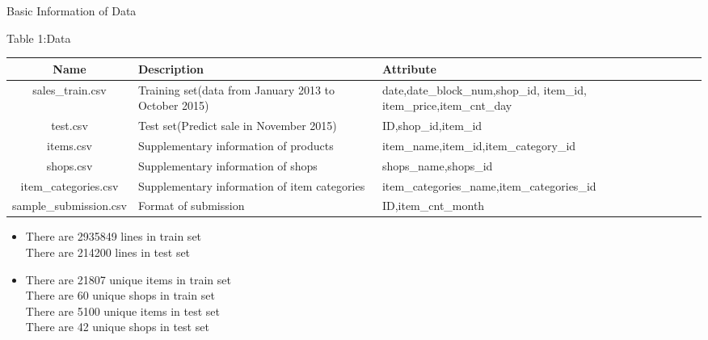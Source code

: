 \documentclass[
size=12pt,
paper=smartboard,  %
mode=present, 		%
display=slides, 	%
style=tuliplab,  	%
pauseslide,
fleqn,leqno]{powerdot}
\begin{document}
	
	\begin{slide}[toc=Basic Information of Data]{Basic Information of Data}
		\smallskip
		\centerline{\normalsize{Table 1:Data}}
		\begin{tabular}{cp{7cm}p{7cm}}
			\hline
			Name&Description&Attribute\\
			\hline
			sales_train.csv& Training set(data from January 2013 to October 2015)&date,date_block_num,shop_id, item_id, item_price,item_cnt_day\\
			test.csv& Test set(Predict sale in November 2015) & ID,shop_id,item_id\\
			items.csv& Supplementary information of products &item_name,item_id,item_category_id\\
			shops.csv& Supplementary information of shops & shops_name,shops_id\\
			item_categories.csv& Supplementary information of item categories & item_categories_name,item_categories_id\\
			sample_submission.csv& Format of submission & ID,item_cnt_month\\
			\hline
		\end{tabular}
		\begin{itemize}
			\bigskip
			\item 
			There are 2935849 lines in train set\\
			There are 214200 lines in test set\\
			\vbox{}
			\item 
			There are 21807 unique items in train set\\
			There are 60 unique shops in train set\\
			There are 5100 unique items in test set\\
			There are 42 unique shops in test set
		\end{itemize}
	\end{slide}
	
\end{document}
